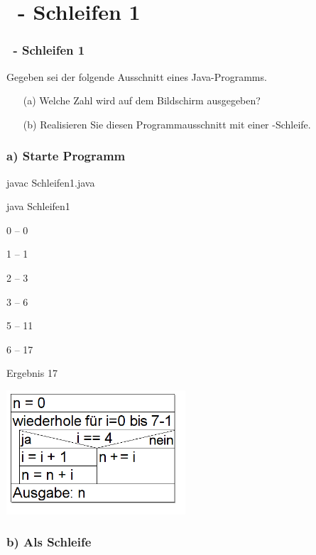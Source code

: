 \def\stitle{\theexercise\ - Schleifen 1}
\section{\stitle}
\begin{frame}[t]%
    \frametitle{\stitle}
\medskip

Gegeben sei der folgende Ausschnitt eines Java-Programms.

\begin{itemize}
\item[(a)] Welche Zahl wird auf dem Bildschirm ausgegeben?
\item[(b)] Realisieren Sie diesen Programmausschnitt mit einer -Schleife.
\end{itemize}

\end{frame}


\begin{frame}[fragile]%
 \frametitle{a) Starte Programm}%

\begin{description}[style=BASH]
\item[Konsole]
\item javac Schleifen1.java
\item java Schleifen1
\item 0  --  0
\item 1  --  1
\item 2  --  3
\item 3  --  6
\item 5  --  11
\item 6  --  17
\item Ergebnis 17
\end{description}

\begin{center}
\includegraphics[width=0.5\textwidth]{schleifen-1/Bilder/Struktogramm}
\end{center}
\end{frame}


\begin{frame}[fragile]%
 \frametitle{b) Als  Schleife}%


\end{frame}
